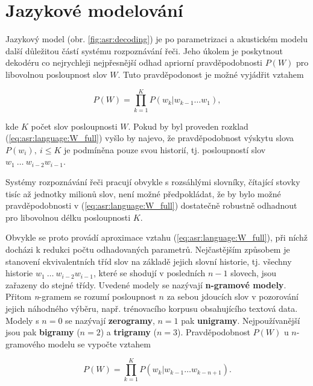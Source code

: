 \section{Jazykové modelování}
\label{chap:asr:language}

Jazykový model (obr. \ref{fig:asr:decoding}) je po parametrizaci a akustickém modelu další důležitou částí systému rozpoznávání řeči. Jeho úkolem je poskytnout dekodéru co nejrychleji nejpřesnější odhad apriorní pravděpodobnosti $P\left(W\right)$ pro libovolnou posloupnost slov $W$. Tuto pravděpodonost je možné vyjádřit vztahem

\begin{equation}
  P\left(W\right) = \prod_{k=1}^{K} P\left(w_k | w_{k-1}\dots w_{1}\right),
  \label{eq:asr:language:W_full}
\end{equation}

\noindent kde $K$ počet slov posloupnosti $W$. Pokud by byl proveden rozklad (\ref{eq:asr:language:W_full}) vyšlo by najevo, že pravděpodobnost výskytu slova $P\left(w_i\right),\ i \leq K$ je podmíněna pouze svou historií, tj. posloupností slov $w_1\ \dots\ w_{i-2}w_{i-1}$.

Systémy rozpoznávání řeči pracují obvykle s rozsáhlými slovníky, čítající stovky tisíc až jednotky milionů slov, není možné předpokládat, že by bylo možné pravděpodobnosti v (\ref{eq:asr:language:W_full}) dostatečně robustně odhadnout pro libovolnou délku posloupnosti $K$.

Obvykle se proto provádí aproximace vztahu (\ref{eq:asr:language:W_full}), při níchž docházi k redukci počtu odhadovaných parametrů. Nejčastějším způsobem je stanovení ekvivalentních tříd slov na základě jejich slovní historie, tj. všechny historie $w_1\ \dots\ w_{i-2}w_{i-1}$, které se shodují v posledních $n-1$ slovech, jsou zařazeny do stejné třídy. Uvedené modely se nazývají \textbf{n-gramové modely}. Přitom \textit{n}-gramem se rozumí posloupnost $n$ za sebou jdoucích slov v pozorování jejich náhodného výběru, např. trénovacího korpusu obsahujícího textová data. Modely s $n=0$ se nazývají \textbf{zerogramy}, $n=1$ pak \textbf{unigramy}. Nejpoužívanější jsou pak \textbf{bigramy} ($n=2$) a \textbf{trigramy} ($n=3$). Pravděpodobnost $P\left(W\right)$ u $n$-gramového modelu se vypočte vztahem

\begin{equation}
  P\left(W\right) = \prod_{k=1}^{K} P\left(w_k | w_{k-1}\dots w_{k-n+1}\right).
  \label{eq:asr:language:W}
\end{equation}

